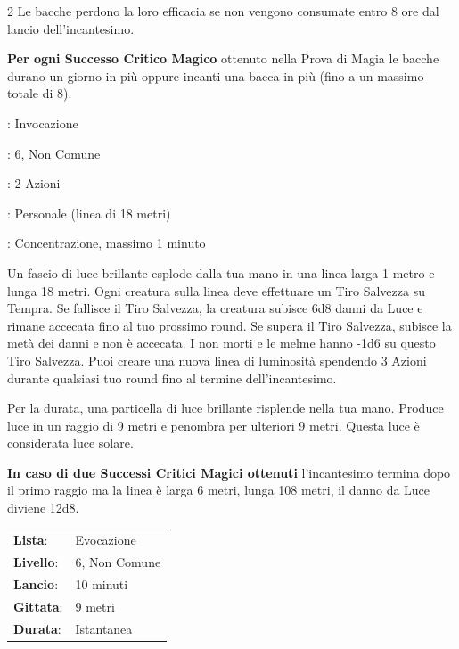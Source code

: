\begin{multicols}{2}
Le bacche perdono la loro efficacia se non vengono consumate entro 8 ore dal lancio dell'incantesimo.

\textbf{Per ogni Successo Critico Magico} ottenuto nella Prova di Magia le bacche durano un giorno in più oppure incanti una bacca in più (fino a un massimo totale di 8).

\noindent
\begin{description}[noitemsep, topsep=0pt, parsep=0pt, partopsep=0pt, leftmargin=0cm, labelwidth=1.3cm]
	\item[\textbf{Lista}]: Invocazione
	\item[\textbf{Livello}]: 6, Non Comune
	\item[\textbf{Lancio}]: 2 Azioni
	\item[\textbf{Gittata}]: Personale (linea di 18 metri)
	\item[\textbf{Durata}]: Concentrazione, massimo 1 minuto
\end{description}

Un fascio di luce brillante esplode dalla tua mano in una linea larga 1 metro e lunga 18 metri. Ogni creatura sulla linea deve effettuare un Tiro Salvezza su Tempra. Se fallisce il Tiro Salvezza, la creatura subisce 6d8 danni da Luce e rimane accecata fino al tuo prossimo round. Se supera il Tiro Salvezza, subisce la metà dei danni e non è accecata. I non morti e le melme hanno -1d6 su questo Tiro Salvezza. Puoi creare una nuova linea di luminosità spendendo 3 Azioni durante qualsiasi tuo round fino al termine dell'incantesimo.

Per la durata, una particella di luce brillante risplende nella tua mano. Produce luce in un raggio di 9 metri e penombra per ulteriori 9 metri. Questa luce è considerata luce solare.

\textbf{In caso di due Successi Critici Magici ottenuti} l'incantesimo termina dopo il primo raggio ma la linea è larga 6 metri, lunga 108 metri, il danno da Luce diviene 12d8.

\noindent\begin{tabularx}{\linewidth}{p{1.9cm}X}
	\rowcolor{gray!20}\textbf{Lista}: & Evocazione \\
	\textbf{Livello}: & 6, Non Comune \\
	\rowcolor{gray!20}\textbf{Lancio}: & 10 minuti \\
	\textbf{Gittata}: & 9 metri \\
	\rowcolor{gray!20}\textbf{Durata}: & Istantanea \\
\end{tabularx}\smallskip


\end{multicols}
